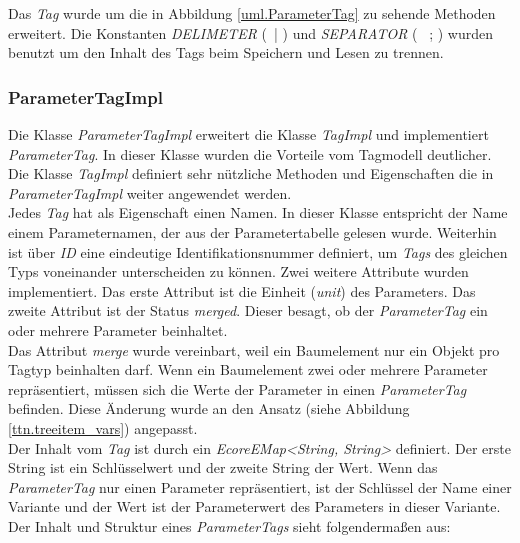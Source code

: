 Das \textit{Tag} wurde um die in Abbildung \ref{uml.ParameterTag} zu sehende Methoden erweitert. Die Konstanten \textit{DELIMETER} (\glqq~| \grqq) und \textit{SEPARATOR} (\glqq~ ; \grqq) wurden benutzt um den Inhalt des Tags beim Speichern und Lesen zu trennen.

\subsubsection{ParameterTagImpl}
Die Klasse \textit{ParameterTagImpl} erweitert die Klasse \textit{TagImpl} und implementiert \textit{ParameterTag}. In dieser Klasse wurden die Vorteile vom Tagmodell deutlicher. Die Klasse \textit{TagImpl} definiert sehr nützliche Methoden und Eigenschaften die in \textit{ParameterTagImpl} weiter angewendet werden.\\


Jedes \textit{Tag} hat als Eigenschaft einen Namen. In dieser Klasse entspricht der Name einem Parameternamen, der aus der Parametertabelle gelesen wurde. Weiterhin ist über \textit{ID} eine eindeutige Identifikationsnummer definiert, um \textit{Tags} des gleichen Typs voneinander unterscheiden zu können. Zwei weitere Attribute wurden  implementiert. Das erste Attribut ist die Einheit (\textit{unit}) des Parameters. Das zweite Attribut ist der Status \textit{merged}. Dieser besagt, ob der \textit{ParameterTag} ein oder mehrere Parameter beinhaltet. \\


Das Attribut \textit{merge} wurde vereinbart, weil ein Baumelement nur ein Objekt pro Tagtyp beinhalten darf. Wenn ein Baumelement zwei oder mehrere Parameter repräsentiert, müssen sich die Werte der Parameter in einen \textit{ParameterTag} befinden. Diese Änderung wurde an den Ansatz (siehe Abbildung \ref{ttn.treeitem_vars}) angepasst.\\


Der Inhalt vom \textit{Tag} ist durch ein \textit{EcoreEMap<String, String>} definiert. Der erste String ist ein Schlüsselwert und der zweite String der Wert. Wenn das \textit{ParameterTag} nur einen Parameter repräsentiert, ist der Schlüssel der Name einer Variante und der Wert ist der Parameterwert des Parameters in dieser Variante. Der Inhalt und Struktur eines \textit{ParameterTags} sieht folgendermaßen aus:\\

